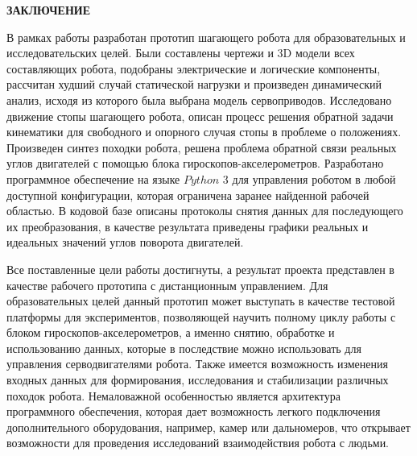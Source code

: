 \newpage
\begin{center}
	\textbf{ЗАКЛЮЧЕНИЕ}
\end{center}

В рамках работы разработан прототип шагающего робота для образовательных и исследовательских целей. Были составлены чертежи и 3D модели всех составляющих робота, подобраны электрические и логические компоненты, рассчитан худший случай статической нагрузки и произведен динамический анализ, исходя из которого была выбрана модель сервоприводов. Исследовано движение стопы шагающего робота, описан процесс решения обратной задачи кинематики для свободного и опорного случая стопы в проблеме о положениях. Произведен синтез походки робота, решена проблема обратной связи реальных углов двигателей с помощью блока гироскопов-акселерометров. Разработано программное обеспечение на языке $Python$ 3 для управления роботом в любой доступной конфигурации, которая ограничена заранее найденной рабочей областью. В кодовой базе описаны протоколы снятия данных для последующего их преобразования, в качестве результата приведены графики реальных и идеальных значений углов поворота двигателей.

Все поставленные цели работы достигнуты, а результат проекта представлен в качестве рабочего прототипа с дистанционным управлением. Для образовательных целей данный прототип может выступать в качестве тестовой платформы для экспериментов, позволяющей научить полному циклу работы с блоком гироскопов-акселерометров, а именно снятию, обработке и использованию данных, которые в последствие можно использовать для управления серводвигателями робота. Также имеется возможность изменения входных данных для формирования, исследования и стабилизации различных походок робота. Немаловажной особенностью является архитектура программного обеспечения, которая дает возможность легкого подключения дополнительного оборудования, например, камер или дальномеров, что открывает возможности для проведения исследований взаимодействия робота с людьми.